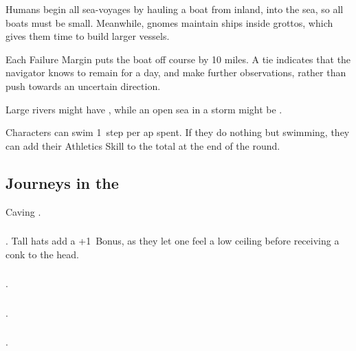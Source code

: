 \begin{multicols}{2}
Humans begin all sea-voyages by hauling a boat from inland, into the sea, so all boats must be small.
Meanwhile, gnomes maintain ships inside grottos, which gives them time to build larger vessels.


Each Failure Margin puts the boat off course by 10 miles.
A tie indicates that the navigator knows to remain for a day, and make further observations, rather than push towards an uncertain direction.

Large rivers might have \tn[8], while an open sea in a storm might be \tn[12].

Characters can swim 1~\gls{step} per \gls{ap} spent.
If they do nothing but swimming, they can add their Athletics Skill to the total at the end of the round.

\subsection{Journeys in the }
Caving .

\subsubsection{}
.
Tall hats add a +1~Bonus, as they let one feel a low ceiling before receiving a conk to the head.

\subsubsection{}
.

\subsubsection{}
.

\subsubsection{}
.


\end{multicols}
